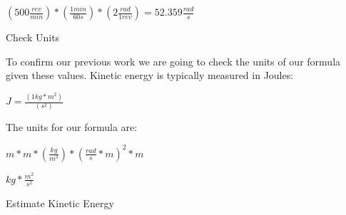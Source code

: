 \documentclass[a4paper, 11pt, oneside]{book} %
\begin{document}
$(500 \frac{rev}{min})*(\frac{1min}{60s})*(2 \frac{rad}{1rev}) = 52.359 \frac{rad}{s}$\\

\vspace{0.5\baselineskip} %
\vspace{0.5\baselineskip} %


{\LARGE Check Units \\} %
\vspace{0.5\baselineskip} %
\vspace{0.5\baselineskip} %

To confirm our previous work we are going to check the units of our formula given these values. Kinetic energy is typically measured in Joules:\\

\vspace{0.5\baselineskip} %
\vspace{0.5\baselineskip} %

$J = \frac{(1kg*m^2)}{(s^2)}$\\

\vspace{0.5\baselineskip} %
\vspace{0.5\baselineskip} %

The units for our formula are:\\

\vspace{0.5\baselineskip} %
\vspace{0.5\baselineskip} %

$m*m*(\frac{kg}{m^3})*(\frac{rad}{s} * m)^2*m$\\

\vspace{0.5\baselineskip} %
\vspace{0.5\baselineskip} %

$kg*\frac{m^2}{s^2}$\\ 

\vspace{0.5\baselineskip} %
\vspace{0.5\baselineskip} %

{\LARGE Estimate Kinetic Energy \\} %
\vspace{0.5\baselineskip} %
\vspace{0.5\baselineskip} %
\end{document}
